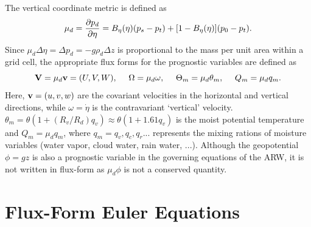 %
The vertical coordinate metric is defined as 
%
\begin{equation}
\mu_d= {\partial p_d\over\partial\eta} = B_\eta(\eta)(p_s-p_t) +[1-B_\eta(\eta)](p_0-p_t). \label{mu_def}
\end{equation}
%
Since $\mu_d \Delta\eta=\Delta p_d=-g\rho_d \Delta z$ is proportional to the mass per unit area within a
grid cell, the appropriate flux forms for the prognostic  variables are defined as
%
\begin{equation}
 \hbox{\bf V} = \mu_d \hbox{\bf  v} =(U,V,W), ~~~~ \Omega = \mu_d\omega, ~~~~ 
     \Theta_m = \mu_d \theta_m, ~~~~ Q_m = \mu_d q_m.                                      
\end{equation}
%
\noindent
Here, ${\hbox{\bf v}} = (u,v,w)$ are the covariant velocities in the
horizontal and vertical directions, while 
$\omega = \dot\eta$ is the contravariant `vertical' velocity.  $\theta_m = \theta (1 + (R_v/R_d) q_v) 
\approx \theta (1 + 1.61 q_v)$ is the moist potential temperature and $Q_m = \mu_d q_m$, where $q_m = q_v, q_c,
q_r ...$ represents the mixing rations of moisture variables (water vapor, cloud water, rain water, ...).  Although the geopotential $\phi=gz$ is also a prognostic variable in the governing equations of the ARW, it is not written in flux-form as $\mu_d\phi$ is not a conserved quantity. 
 
\section{Flux-Form Euler Equations}

